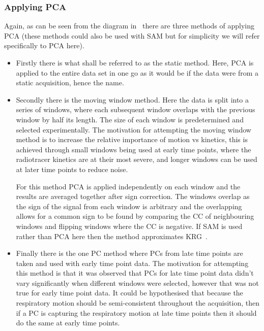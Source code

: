                 \subsubsection{Applying PCA} \label{sec:pca_data_driven_surrogate_signal_extraction_methods_for_dynamic_pet_methods_applying_pca}
                    Again, as can be seen from the diagram in~ there are three methods of applying \gls{PCA} (these methods could also be used with \gls{SAM} but for simplicity we will refer specifically to \gls{PCA} here).
                    
                    \begin{itemize}
                        \item Firstly there is what shall be referred to as the static method. Here, \gls{PCA} is applied to the entire data set in one go as it would be if the data were from a static acquisition, hence the name.
                        
                        \item Secondly there is the moving window method. Here the data is split into a series of windows, where each subsequent window overlaps with the previous window by half its length. The size of each window is predetermined and selected experimentally. The motivation for attempting the moving window method is to increase the relative importance of motion vs kinetics, this is achieved through small windows being used at early time points, where the radiotracer kinetics are at their most severe, and longer windows can be used at later time points to reduce noise.
                        
                        For this method \gls{PCA} is applied independently on each window and the results are averaged together after sign correction. The windows overlap as the sign of the signal from each window is arbitrary and the overlapping allows for a common sign to be found by comparing the \gls{CC} of neighbouring windows and flipping windows where the \gls{CC} is negative. If \gls{SAM} is used rather than \gls{PCA} here then the method approximates \gls{KRG}~\parencite{Schleyer2014}.

                        \item Finally there is the one \gls{PC} method where \glspl{PC} from late time points are taken and used with early time point data. The motivation for attempting this method is that it was observed that \glspl{PC} for late time point data didn't vary significantly when different windows were selected, however that was not true for early time point data. It could be hypothesised that because the respiratory motion should be semi-consistent throughout the acquisition, then if a \gls{PC} is capturing the respiratory motion at late time points then it should do the same at early time points.
                        

\end{itemize}
